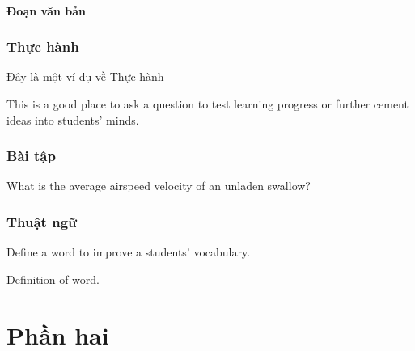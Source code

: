 \documentclass[11pt,fleqn]{book} %
\begin{document}
\subsection{Đoạn văn bản}

\begin{example}[Tên ví dụ]
\lipsum[2]
\end{example}


\section{Thực hành}

Đây là một ví dụ về Thực hành

\begin{exercise}
This is a good place to ask a question to test learning progress or further cement ideas into students' minds.
\end{exercise}


\section{Bài tập}

\begin{problem}
What is the average airspeed velocity of an unladen swallow?
\end{problem}


\section{Thuật ngữ}

Define a word to improve a students' vocabulary.

\begin{vocabulary}[Word]
Definition of word.
\end{vocabulary}


\part{Phần hai}
\end{document}
